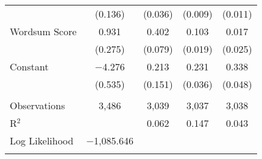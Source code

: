 \begin{table}[!htbp]
\begin{tabular}{@{\extracolsep{0pt}}lcccc}
  & (0.136) & (0.036) & (0.009) & (0.011) \\ 
  Wordsum Score & 0.931 & 0.402 & 0.103 & 0.017 \\ 
  & (0.275) & (0.079) & (0.019) & (0.025) \\ 
  Constant & $-$4.276 & 0.213 & 0.231 & 0.338 \\ 
  & (0.535) & (0.151) & (0.036) & (0.048) \\ 
 \hline \\[-1.8ex] 
Observations & 3,486 & 3,039 & 3,037 & 3,038 \\ 
R$^{2}$ &  & 0.062 & 0.147 & 0.043 \\ 
Log Likelihood & $-$1,085.646 &  &  &  \\ 
\hline 
\hline \\[-1.8ex] 
\end{tabular} 
\end{table} 
